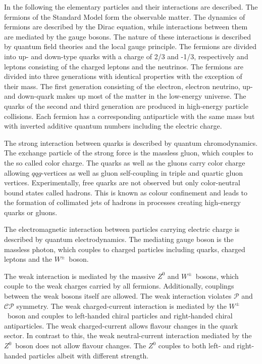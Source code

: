 In the following the elementary particles and their interactions are described.
The fermions of the Standard Model form the observable matter. The dynamics of
fermions are described by the Dirac equation, while interactions between them
are mediated by the gauge bosons. The nature of these interactions is described
by quantum field theories and the local gauge principle. The fermions are
divided into up- and down-type quarks with a charge of 2/3 and -1/3,
respectively and leptons consisting of the charged leptons and the neutrinos.
The fermions are divided into three generations with identical properties with
the exception of their mass. The first generation consisting of the electron,
electron neutrino, up- and down-quark makes up most of the matter in the
low-energy universe. The quarks of the second and third generation are produced
in high-energy particle collisions. Each fermion has a corresponding
antiparticle with the same mass but with inverted additive quantum numbers
including the electric charge.

The strong interaction between quarks is described by quantum chromodynamics.
The exchange particle of the strong force is the massless gluon, which couples
to the so called color charge. The quarks as well as the gluons carry color
charge allowing $qqg$-vertices as well as gluon self-coupling in triple and
quartic gluon vertices. Experimentally, free quarks are not observed but only
color-neutral bound states called hadrons. This is known as colour confinement
and leads to the formation of collimated jets of hadrons in processes creating
high-energy quarks or gluons.

The electromagnetic interaction between particles carrying electric charge is
described by quantum electrodynamics. The mediating gauge boson is the massless
photon, which couples to charged particles including quarks, charged leptons and
the $W^\pm$~boson.

The weak interaction is mediated by the massive $Z^0$ and $W^\pm$~bosons, which
couple to the weak charges carried by all fermions. Additionally, couplings
between the weak bosons itself are allowed. The weak interaction violates
$\mathcal{P}$ and $\mathcal{CP}$ symmetry. The weak charged-current interaction
is mediated by the $W^\pm$~boson and couples to left-handed chiral particles and
right-handed chiral antiparticles. The weak charged-current allows flavour
changes in the quark sector. In contrast to this, the weak neutral-current
interaction mediated by the $Z^0$~boson does not allow flavour changes. The
$Z^0$ couples to both left- and right-handed particles albeit with different
strength.



